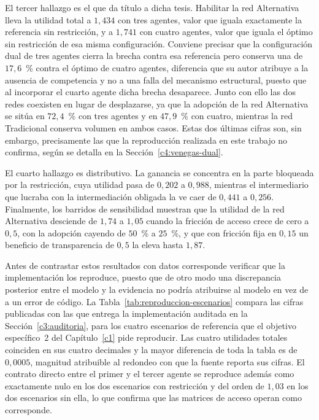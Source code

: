 El tercer hallazgo es el que da título a dicha tesis. Habilitar la red Alternativa lleva la utilidad total a $1,434$ con tres agentes, valor que iguala exactamente la referencia sin restricción, y a $1,741$ con cuatro agentes, valor que iguala el óptimo sin restricción de esa misma configuración. Conviene precisar que la configuración dual de tres agentes cierra la brecha contra esa referencia pero conserva una de $17,6$~\% contra el óptimo de cuatro agentes, diferencia que su autor atribuye a la ausencia de competencia y no a una falla del mecanismo estructural, puesto que al incorporar el cuarto agente dicha brecha desaparece. Junto con ello las dos redes coexisten en lugar de desplazarse, ya que la adopción de la red Alternativa se sitúa en $72,4$~\% con tres agentes y en $47,9$~\% con cuatro, mientras la red Tradicional conserva volumen en ambos casos. Estas dos últimas cifras son, sin embargo, precisamente las que la reproducción realizada en este trabajo no confirma, según se detalla en la Sección~\ref{c4:venegas-dual}.

El cuarto hallazgo es distributivo. La ganancia se concentra en la parte
bloqueada por la restricción, cuya utilidad pasa de $0,202$ a $0,988$, mientras el intermediario que lucraba con la intermediación obligada la ve caer de $0,441$ a $0,256$. Finalmente, los barridos de sensibilidad muestran que la utilidad de la red Alternativa desciende de $1,74$ a $1,05$ cuando la fricción de acceso crece de cero a $0,5$, con la adopción cayendo de $50$~\% a $25$~\%, y que con fricción fija en $0,15$ un beneficio de transparencia de $0,5$ la eleva hasta $1,87$.

Antes de contrastar estos resultados con datos corresponde verificar que la
implementación los reproduce, puesto que de otro modo una discrepancia posterior
entre el modelo y la evidencia no podría atribuirse al modelo en vez de a un
error de código. La Tabla~\ref{tab:reproduccion-escenarios} compara las cifras publicadas
con las que entrega la implementación auditada en la Sección~\ref{c3:auditoria},
para los cuatro escenarios de referencia que el objetivo específico~2 del
Capítulo~\ref{c1} pide reproducir. Las cuatro utilidades totales coinciden en sus
cuatro decimales y la mayor diferencia de toda la tabla es de $0,0005$, magnitud
atribuible al redondeo con que la fuente reporta sus cifras. El contrato directo
entre el primer y el tercer agente se reproduce además como exactamente nulo en
los dos escenarios con restricción y del orden de $1,03$ en los dos escenarios
sin ella, lo que confirma que las matrices de acceso operan como corresponde.

